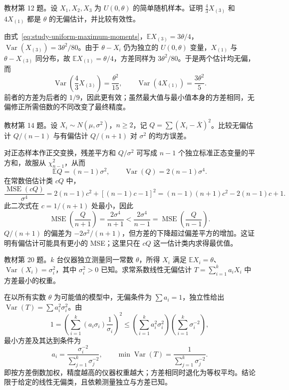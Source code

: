 \begin{example}
\label{ex:study-ch6-ex12}
教材第 12 题。设 $X_1,X_2,X_3$ 为 $U(0,\theta)$ 的简单随机样本。证明 $\tfrac43X_{(3)}$ 和 $4X_{(1)}$ 都是 $\theta$ 的无偏估计，并比较有效性。
\end{example}

\begin{solve}
由式~\eqref{eq:study-uniform-maximum-moments}，$\mathbb E X_{(3)}=3\theta/4$，$\operatorname{Var}(X_{(3)})=3\theta^2/80$。由于 $\theta-X_i$ 仍为独立的 $U(0,\theta)$ 变量，$X_{(1)}$ 与 $\theta-X_{(3)}$ 同分布，故 $\mathbb E X_{(1)}=\theta/4$，方差同样为 $3\theta^2/80$。于是两个估计均无偏，而
\[
  \operatorname{Var}\!\left(\frac43X_{(3)}\right)
     =\frac{\theta^2}{15},\qquad
  \operatorname{Var}(4X_{(1)})=\frac{3\theta^2}{5}.
\]
前者的方差为后者的 $1/9$，因此更有效；虽然最大值与最小值本身的方差相同，无偏修正所需倍数的不同改变了最终精度。
\end{solve}

\begin{example}
\label{ex:study-ch6-ex14}
教材第 14 题。设 $X_i\sim N(\mu,\sigma^2)$，$n\ge2$，记 $Q=\sum(X_i-\overline X)^2$。比较无偏估计 $Q/(n-1)$ 与有偏估计 $Q/(n+1)$ 对 $\sigma^2$ 的均方误差。
\end{example}

\begin{solve}
对正态样本作正交变换，残差平方和 $Q/\sigma^2$ 可写成 $n-1$ 个独立标准正态变量的平方和，故服从 $\chi^2_{n-1}$，从而
\[
  \mathbb E Q=(n-1)\sigma^2,\qquad
  \operatorname{Var}(Q)=2(n-1)\sigma^4.
\]
在常数倍估计类 $cQ$ 中，
\[
  \frac{\operatorname{MSE}(cQ)}{\sigma^4}
     =2(n-1)c^2+[(n-1)c-1]^2
     =(n-1)(n+1)c^2-2(n-1)c+1.
\]
此二次式在 $c=1/(n+1)$ 处最小，因此
\[
  \operatorname{MSE}\!\left(\frac Q{n+1}\right)
     =\frac{2\sigma^4}{n+1}
     <\frac{2\sigma^4}{n-1}
     =\operatorname{MSE}\!\left(\frac Q{n-1}\right).
\]
$Q/(n+1)$ 的偏差为 $-2\sigma^2/(n+1)$，但方差的下降超过偏差平方的增加。这证明有偏估计可能具有更小的 MSE；这里只在 $cQ$ 这一估计类内求得最优值。
\end{solve}

\begin{example}
\label{ex:study-ch6-ex20}
教材第 20 题。$k$ 台仪器独立测量同一常数 $\theta$，所得 $X_i$ 满足 $\mathbb E X_i=\theta$、$\operatorname{Var}(X_i)=\sigma_i^2$，其中 $\sigma_i^2>0$ 已知。求常系数线性无偏估计 $T=\sum_{i=1}^ka_iX_i$ 中方差最小的权重。
\end{example}

\begin{solve}
在以所有实数 $\theta$ 为可能值的模型中，无偏条件为 $\sum a_i=1$，独立性给出 $\operatorname{Var}(T)=\sum a_i^2\sigma_i^2$。由
\[
  1=\left(\sum_{i=1}^k(a_i\sigma_i)\frac1{\sigma_i}\right)^2
    \le\left(\sum_{i=1}^ka_i^2\sigma_i^2\right)
       \left(\sum_{i=1}^k\sigma_i^{-2}\right),
\]
最小方差及其达到条件为
\[
  a_i=\frac{\sigma_i^{-2}}{\sum_{j=1}^k\sigma_j^{-2}},
  \qquad
  \min\operatorname{Var}(T)
       =\frac1{\sum_{j=1}^k\sigma_j^{-2}}.
\]
即按方差倒数加权，精度越高的仪器权重越大；方差相同时退化为等权平均。结论限于给定的线性无偏类，且依赖测量独立与方差已知。
\end{solve}


